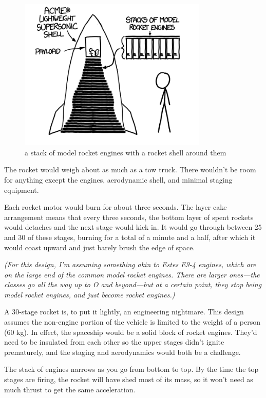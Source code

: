 \begin{figure}[!htbp]
\centering
\includegraphics[scale=0.5, max width=0.8\textwidth]{imgs/a/24/model_suborbital.png}
\caption{a stack of model rocket engines with a rocket shell around them}
\end{figure}

{The rocket would weigh about as much as a tow truck. There wouldn’t be room for anything except the engines, aerodynamic shell, and minimal staging equipment.}

{Each rocket motor would burn for about three seconds. The layer cake arrangement means that every three seconds, the bottom layer of spent rockets would detaches and the next stage would kick in. It would go through between 25 and 30 of these stages, burning for a total of a minute and a half, after which it would coast upward and just barely brush the edge of space.}

{ \emph{(For this design, I’m assuming something akin to Estes E9-4 engines, which are on the large end of the common model rocket engines. There are larger ones—the classes go all the way up to O and beyond—but at a certain point, they stop being model rocket engines, and just become rocket engines.)} }

{A 30-stage rocket is, to put it lightly, an engineering nightmare. This design assumes the non-engine portion of the vehicle is limited to the weight of a person (60 kg). In effect, the spaceship would be a solid block of rocket engines. They’d need to be insulated from each other so the upper stages didn’t ignite prematurely, and the staging and aerodynamics would both be a challenge.}

{The stack of engines narrows as you go from bottom to top. By the time the top stages are firing, the rocket will have shed most of its mass, so it won’t need as much thrust to get the same acceleration.}

